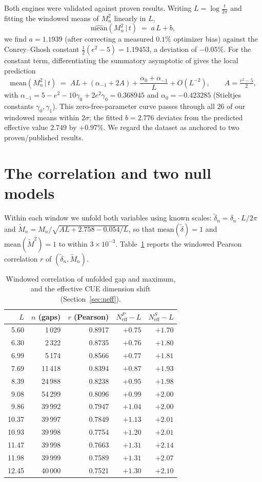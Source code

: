 \documentclass[12pt]{amsart}
\begin{document}
Both engines were validated against proven results. Writing
$L = \log\frac{t}{2\pi}$ and fitting the windowed means of $M_n^2$ linearly
in $L$,
\[
\widehat{\mathrm{mean}}(M_n^2 \,|\, t) \;=\; a\,L + b,
\]
we find $a = 1.1939$ (after correcting a measured $0.1\%$ optimizer bias)
against the Conrey--Ghosh constant $\tfrac12(e^2-5) = 1.19453$, a deviation
of $-0.05\%$. For the constant term, differentiating the summatory
asymptotic of \cite{HLPC24} gives the local prediction
\[
\mathrm{mean}(M_n^2 \,|\, t) \;=\; A L + (\alpha_{-1} + 2A) +
\frac{\alpha_0+\alpha_{-1}}{L} + O(L^{-2}),
\qquad A = \tfrac{e^2-5}{2},
\]
with $\alpha_{-1} = 5 - e^2 - 10\gamma_0 + 2e^2\gamma_0 = 0.368945$ and
$\alpha_0 = -0.423285$ (Stieltjes constants $\gamma_0,\gamma_1$). This
zero-free-parameter curve passes through all $26$ of our windowed means
within $2\sigma$; the fitted $b = 2.776$ deviates from the predicted
effective value $2.749$ by $+0.97\%$. We regard the dataset as anchored to
two proven/published results.

\section{The correlation and two null models}\label{sec:corr}

Within each window we unfold both variables using known scales:
$\tilde{\delta}_n = \delta_n \cdot L/2\pi$ and
$\tilde{M}_n = M_n / \sqrt{AL + 2.758 - 0.054/L}$, so that
$\mathrm{mean}(\tilde\delta) = 1$ and $\mathrm{mean}(\tilde M^2) = 1$
to within $3\times10^{-3}$. Table~\ref{tab:zeta} reports the windowed Pearson
correlation $r$ of $(\tilde\delta_n, \tilde M_n)$.

\begin{table}[ht]
\centering
\caption{Windowed correlation of unfolded gap and maximum, and the
effective CUE dimension shift (Section~\ref{sec:neff}).}
\label{tab:zeta}
\begin{tabular}{rrrrr}
\toprule
$L$ & $n$ (gaps) & $r$ (Pearson) & $N_{\mathrm{eff}}^{P} - L$ &
$N_{\mathrm{eff}}^{S} - L$ \\
\midrule
 5.60 &  1\,029 & 0.8917 & $+0.75$ & $+1.70$ \\
 6.30 &  2\,322 & 0.8735 & $+0.76$ & $+1.80$ \\
 6.99 &  5\,174 & 0.8566 & $+0.77$ & $+1.81$ \\
 7.69 & 11\,418 & 0.8394 & $+0.87$ & $+1.93$ \\
 8.39 & 24\,988 & 0.8238 & $+0.95$ & $+1.98$ \\
 9.08 & 54\,299 & 0.8096 & $+0.99$ & $+2.00$ \\
 9.86 & 39\,992 & 0.7947 & $+1.04$ & $+2.00$ \\
10.37 & 39\,997 & 0.7849 & $+1.13$ & $+2.01$ \\
10.93 & 39\,998 & 0.7754 & $+1.20$ & $+2.01$ \\
11.47 & 39\,998 & 0.7663 & $+1.31$ & $+2.14$ \\
11.98 & 39\,999 & 0.7589 & $+1.31$ & $+2.07$ \\
12.45 & 40\,000 & 0.7521 & $+1.30$ & $+2.10$ \\
\bottomrule
\end{tabular}
\end{table}
\end{document}
